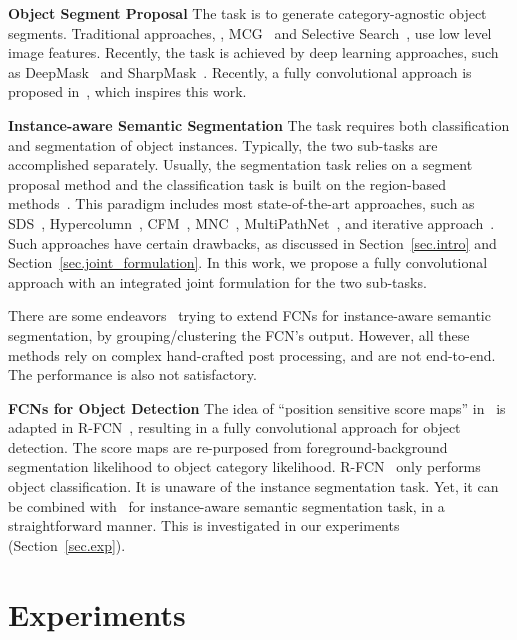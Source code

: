 \documentclass[10pt,twocolumn,letterpaper]{article}
\begin{document}
\textbf{Object Segment Proposal} The task is to generate category-agnostic object segments. Traditional approaches, \eg, MCG~\cite{arbelaez2014mcg} and Selective Search~\cite{sande2011selective}, use low level image features. Recently, the task is achieved by deep learning approaches, such as DeepMask~\cite{pinheiro2015learning} and SharpMask~\cite{pinheiro2016refine}. Recently, a fully convolutional approach is proposed in~\cite{dai2016instance}, which inspires this work.

\textbf{Instance-aware Semantic Segmentation} The task requires both classification and segmentation of object instances. Typically, the two sub-tasks are accomplished separately. Usually, the segmentation task relies on a segment proposal method and the classification task is built on the region-based methods~\cite{girshick2014rich,girshick2015fast,ren2015faster}. This paradigm includes most state-of-the-art approaches, such as SDS~\cite{hariharan2014simultaneous}, Hypercolumn~\cite{hariharan2015hyper}, CFM~\cite{dai2015convolutional}, MNC~\cite{dai2016mnc}, MultiPathNet~\cite{zagoruyko2016multipath}, and iterative approach~\cite{li2016iterative}. Such approaches have certain drawbacks, as discussed in Section~\ref{sec.intro} and Section~\ref{sec.joint_formulation}. In this work, we propose a fully convolutional approach with an integrated joint formulation for the two sub-tasks.

There are some endeavors~\cite{liang2015proposal,liu2016multiscale} trying to extend FCNs for instance-aware semantic segmentation, by grouping/clustering the FCN's output. However, all these methods rely on complex hand-crafted post processing, and are not end-to-end. The performance is also not satisfactory.

\textbf{FCNs for Object Detection}
The idea of ``position sensitive score maps'' in~\cite{dai2016instance} is adapted in R-FCN~\cite{dai2016rfcn}, resulting in a fully convolutional approach for object detection. The score maps are re-purposed from foreground-background segmentation likelihood to object category likelihood. R-FCN~\cite{dai2016rfcn} only performs object classification. It is unaware of the instance segmentation task. Yet, it can be combined with~\cite{dai2016instance} for instance-aware semantic segmentation task, in a straightforward manner. This is investigated in our experiments (Section~\ref{sec.exp}).



\section{Experiments}
\end{document}

